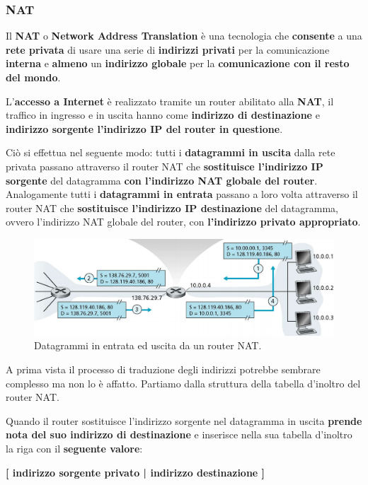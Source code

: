 \documentclass[11pt,a4paper,oneside]{book}
\theoremstyle{definition}
\begin{document}
\pagebreak

\subsubsection{NAT}
Il \textbf{NAT} o \textbf{Network Address Translation} è una tecnologia che \textbf{consente} a una \textbf{rete privata} di usare una serie di \textbf{indirizzi privati} per la comunicazione \textbf{interna} e \textbf{almeno} un \textbf{indirizzo globale} per la \textbf{comunicazione con il resto del mondo}.

L'\textbf{accesso a Internet} è realizzato tramite un router abilitato alla \textbf{NAT}, il traffico in ingresso e in uscita hanno come \textbf{indirizzo di destinazione} e \textbf{indirizzo sorgente l'indirizzo IP del router in questione}.

Ciò si effettua nel seguente modo: tutti i \textbf{datagrammi in uscita} dalla rete privata passano attraverso il router NAT che \textbf{sostituisce l'indirizzo IP sorgente} del datagramma \textbf{con l'indirizzo NAT globale del router}. Analogamente tutti i \textbf{datagrammi in entrata} passano a loro volta attraverso il router NAT che \textbf{sostituisce l'indirizzo IP destinazione} del datagramma, ovvero l'indirizzo NAT globale del router, con \textbf{l'indirizzo privato appropriato}.

\begin{figure}[!h]
	\includegraphics[scale=0.35]{Immagini/Ip_nat.png}
	\centering
	\caption{Datagrammi in entrata ed uscita da un router NAT.}
\end{figure}

A prima vista il processo di traduzione degli indirizzi potrebbe sembrare complesso ma non lo è affatto. Partiamo dalla struttura della tabella d'inoltro del router NAT.

Quando il router sostituisce l'indirizzo sorgente nel datagramma in uscita \textbf{prende nota del suo indirizzo di destinazione} e inserisce nella sua tabella d'inoltro la riga con il \textbf{seguente valore}:

\begin{center}
	\textbf{[ indirizzo sorgente privato | indirizzo destinazione ]}
\end{center}
\end{document}
